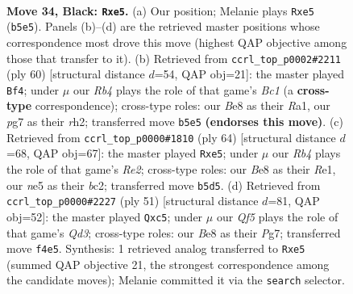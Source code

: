 \documentclass[11pt]{article}
\begin{document}
\clearpage

\begin{figure}[p]\centering
\begin{subfigure}{0.46\textwidth}\centering
\resizebox{\linewidth}{!}{%
\newchessgame
\chessboard[
  setfen={r3b1k1/p4pP1/8/pr2N3/4pq2/PP5K/1Q3P2/R3R3 b - - 8 34},
  showmover=false,
  pgfstyle=straightmove, color=movearrow, markmove={b5-e5}
]}
\caption{}
\end{subfigure}\hfill
\begin{subfigure}{0.46\textwidth}\centering
\resizebox{\linewidth}{!}{%
\newchessgame
\chessboard[
  setfen={5r1k/pN5p/2n4q/6p1/2R5/2P2QP1/PP5r/R1B3K1 w - - 1 31},
  showmover=false,
  pgfstyle=straightmove, color=movearrow, markmove={c1-f4}
]}
\caption{}
\end{subfigure}
\\[4pt]
\begin{subfigure}{0.46\textwidth}\centering
\resizebox{\linewidth}{!}{%
\newchessgame
\chessboard[
  setfen={2r2r1k/4n2p/1p1q4/p2Pp1QP/8/6P1/2b1RPB1/4R1K1 w - - 1 33},
  showmover=false,
  pgfstyle=straightmove, color=movearrow, markmove={e2-e5}
]}
\caption{}
\end{subfigure}\hfill
\begin{subfigure}{0.46\textwidth}\centering
\resizebox{\linewidth}{!}{%
\newchessgame
\chessboard[
  setfen={r5k1/6pp/3qp3/2N1p3/1r1p4/5P1P/PP2Q1P1/1K1RR3 b - - 0 26},
  showmover=false,
  pgfstyle=straightmove, color=movearrow, markmove={d6-c5}
]}
\caption{}
\end{subfigure}
\caption{\textbf{Move 34, Black: \texttt{Rxe5}.} (a) Our position; Melanie plays \texttt{Rxe5} (\texttt{b5e5}). Panels (b)--(d) are the retrieved master positions whose correspondence most drove this move (highest QAP objective among those that transfer to it). (b) Retrieved from \texttt{ccrl\_top\_p0002\#2211} (ply 60) [structural distance $d$=54, QAP obj=21]: the master played \texttt{Bf4}; under $\mu$ our \emph{Rb4} plays the role of that game's \emph{Bc1} (a \textbf{cross-type} correspondence); cross-type roles: our \emph{B}e8 as their \emph{R}a1, our \emph{p}g7 as their \emph{r}h2; transferred move \texttt{b5e5} \textbf{(endorses this move)}. (c) Retrieved from \texttt{ccrl\_top\_p0000\#1810} (ply 64) [structural distance $d$=68, QAP obj=67]: the master played \texttt{Rxe5}; under $\mu$ our \emph{Rb4} plays the role of that game's \emph{Re2}; cross-type roles: our \emph{B}e8 as their \emph{R}e1, our \emph{n}e5 as their \emph{b}c2; transferred move \texttt{b5d5}. (d) Retrieved from \texttt{ccrl\_top\_p0000\#2227} (ply 51) [structural distance $d$=81, QAP obj=52]: the master played \texttt{Qxc5}; under $\mu$ our \emph{Qf5} plays the role of that game's \emph{Qd3}; cross-type roles: our \emph{B}e8 as their \emph{P}g7; transferred move \texttt{f4e5}. Synthesis: 1 retrieved analog transferred to \texttt{Rxe5} (summed QAP objective 21, the strongest correspondence among the candidate moves); Melanie committed it via the \texttt{search} selector.}
\label{fig:thought-m67}
\end{figure}
\end{document}
